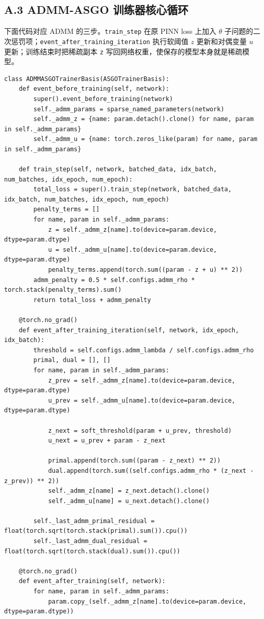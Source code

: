 \documentclass[UTF8,a4paper,12pt,fontset=none]{ctexart}
\begin{document}
\subsection{A.3 ADMM-ASGO 训练器核心循环}

下面代码对应 ADMM 的三步。\texttt{train\_step} 在原 PINN loss 上加入 $\theta$ 子问题的二次惩罚项；\texttt{event\_after\_training\_iteration} 执行软阈值 $z$ 更新和对偶变量 $u$ 更新；训练结束时把稀疏副本 \texttt{z} 写回网络权重，使保存的模型本身就是稀疏模型。

\begin{lstlisting}
class ADMMASGOTrainerBasis(ASGOTrainerBasis):
    def event_before_training(self, network):
        super().event_before_training(network)
        self._admm_params = sparse_named_parameters(network)
        self._admm_z = {name: param.detach().clone() for name, param in self._admm_params}
        self._admm_u = {name: torch.zeros_like(param) for name, param in self._admm_params}

    def train_step(self, network, batched_data, idx_batch, num_batches, idx_epoch, num_epoch):
        total_loss = super().train_step(network, batched_data, idx_batch, num_batches, idx_epoch, num_epoch)
        penalty_terms = []
        for name, param in self._admm_params:
            z = self._admm_z[name].to(device=param.device, dtype=param.dtype)
            u = self._admm_u[name].to(device=param.device, dtype=param.dtype)
            penalty_terms.append(torch.sum((param - z + u) ** 2))
        admm_penalty = 0.5 * self.configs.admm_rho * torch.stack(penalty_terms).sum()
        return total_loss + admm_penalty

    @torch.no_grad()
    def event_after_training_iteration(self, network, idx_epoch, idx_batch):
        threshold = self.configs.admm_lambda / self.configs.admm_rho
        primal, dual = [], []
        for name, param in self._admm_params:
            z_prev = self._admm_z[name].to(device=param.device, dtype=param.dtype)
            u_prev = self._admm_u[name].to(device=param.device, dtype=param.dtype)

            z_next = soft_threshold(param + u_prev, threshold)
            u_next = u_prev + param - z_next

            primal.append(torch.sum((param - z_next) ** 2))
            dual.append(torch.sum((self.configs.admm_rho * (z_next - z_prev)) ** 2))
            self._admm_z[name] = z_next.detach().clone()
            self._admm_u[name] = u_next.detach().clone()

        self._last_admm_primal_residual = float(torch.sqrt(torch.stack(primal).sum()).cpu())
        self._last_admm_dual_residual = float(torch.sqrt(torch.stack(dual).sum()).cpu())

    @torch.no_grad()
    def event_after_training(self, network):
        for name, param in self._admm_params:
            param.copy_(self._admm_z[name].to(device=param.device, dtype=param.dtype))
\end{lstlisting}
\end{document}
